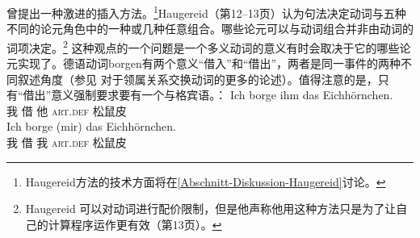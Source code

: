 \begin{exe}
\begin{xlist}[iv.]
\begin{exe}
\begin{xlist}[iv.]
 \citet{Haugereid2009a}曾提出一种激进的插入方法。\footnote{%
  Haugereid方法的技术方面将在\ref{Abschnitt-Diskussion-Haugereid}讨论。
}Haugereid（第12--13页）认为句法决定动词与五种不同的论元角色中的一种或几种任意组合。哪些论元可以与动词组合并非由动词的词项决定。\footnote{%
  Haugereid 可以对动词进行配价限制，但是他声称他用这种方法只是为了让自己的计算程序运作更有效（第13页）。
}
这种观点的一个问题是一个多义动词的意义有时会取决于它的哪些论元实现了。德语动词borgen有两个意义“借入”和“借出”，两者是同一事件的两种不同叙述角度（参见 对于领属关系交换动词的更多的论述）。值得注意的是，只有“借出”意义强制要求要有一个与格宾语。\citep[]{MuellerGTBuch1}：
\eal
\ex 
\gll Ich borge ihm das Eichhörnchen.\\
     我   借  他 \textsc{art}.\textsc{def} 松鼠皮\\
\ex 
\gll Ich borge (mir) das Eichhörnchen.\\
     我 借 我 \textsc{art}.\textsc{def} 松鼠皮\\

\end{xlist}
\end{exe}
\end{xlist}
\end{exe}
